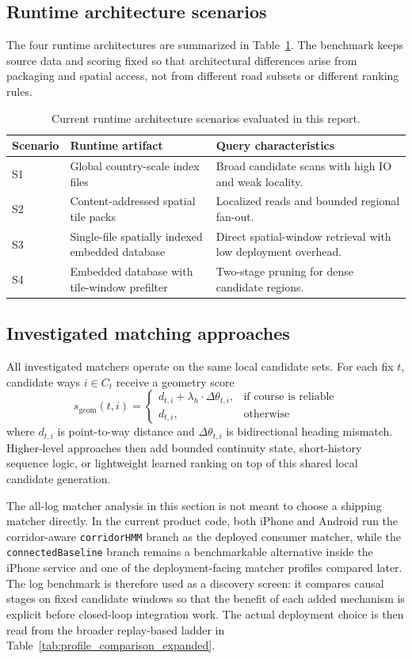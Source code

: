 \documentclass{article}
\begin{document}
\subsection{Runtime architecture scenarios}
The four runtime architectures are summarized in Table~\ref{tab:scenario_overview}. The benchmark keeps source data and scoring fixed so that architectural differences arise from packaging and spatial access, not from different road subsets or different ranking rules.

\begin{table}[!htbp]
\centering
\caption{Current runtime architecture scenarios evaluated in this report.}
\label{tab:scenario_overview}
\begin{tabular}{p{1.3cm}p{3.2cm}p{6.3cm}}
\toprule
Scenario & Runtime artifact & Query characteristics \\
\midrule
S1 & Global country-scale index files & Broad candidate scans with high IO and weak locality. \\
S2 & Content-addressed spatial tile packs & Localized reads and bounded regional fan-out. \\
S3 & Single-file spatially indexed embedded database & Direct spatial-window retrieval with low deployment overhead. \\
S4 & Embedded database with tile-window prefilter & Two-stage pruning for dense candidate regions. \\
\bottomrule
\end{tabular}
\end{table}

\subsection{Investigated matching approaches}
All investigated matchers operate on the same local candidate sets. For each fix \(t\), candidate ways \(i \in C_t\) receive a geometry score
\[
s_{\mathrm{geom}}(t,i)=
\begin{cases}
d_{t,i} + \lambda_h \cdot \Delta \theta_{t,i}, & \text{if course is reliable} \\
d_{t,i}, & \text{otherwise}
\end{cases}
\]
where \(d_{t,i}\) is point-to-way distance and \(\Delta \theta_{t,i}\) is bidirectional heading mismatch. Higher-level approaches then add bounded continuity state, short-history sequence logic, or lightweight learned ranking on top of this shared local candidate generation.

The all-log matcher analysis in this section is not meant to choose a shipping matcher directly. In the current product code, both iPhone and Android run the corridor-aware \texttt{corridorHMM} branch as the deployed consumer matcher, while the \texttt{connectedBaseline} branch remains a benchmarkable alternative inside the iPhone service and one of the deployment-facing matcher profiles compared later. The log benchmark is therefore used as a discovery screen: it compares causal stages on fixed candidate windows so that the benefit of each added mechanism is explicit before closed-loop integration work. The actual deployment choice is then read from the broader replay-based ladder in Table~\ref{tab:profile_comparison_expanded}.
\end{document}

